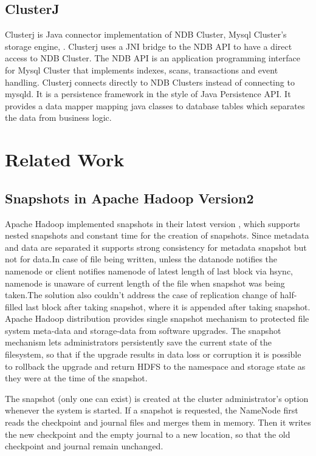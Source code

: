 \subsection{ClusterJ}
Clusterj  is   Java  connector  implementation  of  NDB  Cluster,  Mysql  Cluster’s   storage  engine, \cite{29}.  Clusterj  uses   a  JNI  bridge  to  the  NDB  API  to  have  a  direct  access   to  NDB
Cluster.  The  NDB  API  is   an  application  programming  interface  for  Mysql  Cluster  that
implements   indexes,  scans,  transactions   and  event  handling.  Clusterj  connects   directly   to
NDB  Clusters   instead  of  connecting  to  mysqld.  It  is   a  persistence  framework   in  the  style of
Java  Persistence  API.  It  provides   a  data  mapper  mapping  java  classes   to  database  tables
which separates the data from business logic.

\section{Related Work}
\subsection{Snapshots in Apache Hadoop Version2}
Apache Hadoop implemented snapshots in their latest version \cite{Hadoop2} , which supports nested snapshots and constant time for the creation of snapshots. Since metadata and data are separated it supports strong consistency for metadata snapshot but not for data.In case of file being written, unless the datanode notifies the namenode or client notifies namenode of latest length of last block via hsync, namenode is unaware of current length of the file when snapshot was being taken.The solution also couldn't address the case of replication change of half-filled last block after taking snapshot, where it is appended after taking snapshot.\\
Apache Hadoop distribution provides single snapshot mechanism to protected file system meta-data and storage-data from software upgrades. The snapshot mechanism lets administrators persistently save the current state of the filesystem, so that if the upgrade results in data loss or corruption it is possible to rollback the upgrade and return HDFS to the namespace and storage state as they were at the time of the snapshot.

The snapshot (only one can exist) is created at the cluster administrator's option whenever the system is started. If a snapshot is requested, the NameNode first reads the checkpoint and journal files and merges them in memory. Then it writes the new checkpoint and the empty journal to a new location, so that the old checkpoint and journal remain unchanged.


